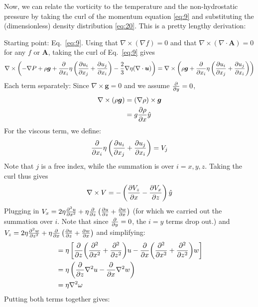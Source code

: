 \documentclass[document.tex]{subfiles}
\begin{document}
Now, we can relate the vorticity to the temperature and the non-hydrostatic pressure by taking the curl of the momentum equation \eqref{eq:9} and substituting the 
(dimensionless) density distribution \eqref{eq:20}. This is a pretty lengthy derivation: 
\begin{mdframed}
    Starting point: Eq.~\eqref{eq:9}. Using that $\nabla \times (\nabla f) = 0$ and that $\nabla \times (\nabla \cdot \bm{A}) = 0$ for any $f$ or $\bm{A}$, taking the curl of Eq.~\eqref{eq:9} gives 
    \begin{align*}
        \nabla \times \left(-\nabla P + \rho \bm{g} + \pdv{x_i}\eta\left(\pdv{u_i}{x_j}+\pdv{u_j}{x_i}\right) - \frac{2}{3}\nabla \eta (\nabla \cdot \bm{u})\right)  = \nabla \times \left(\rho \bm{g}+\pdv{x_i}\eta\left(\pdv{u_i}{x_j}+\pdv{u_j}{x_i}\right) \right) \\
    \end{align*}
    Each term separately: 
    Since $\nabla \times \bm{g} = 0$ and we assume $\pdv{y} = 0$, 
    \begin{align*}
        \nabla \times (\rho\bm{g}) &= (\nabla \rho) \times \bm{g} \\
        &= g \pdv{\rho}{x}\hat{y}
    \end{align*}
    For the viscous term, we define: 
    \begin{align*}
        \pdv{x_i}\eta\left(\pdv{u_i}{x_j}+\pdv{u_j}{x_i}\right) = V_j
    \end{align*}
    Note that $j$ is a free index, while the summation is over $i=x,y,z$. Taking the curl thus gives
    \begin{align*}
        \nabla \times V &= -\left(\pdv{V_z}{x} -\pdv{V_x}{z}\right)\hat{y} \\
    \end{align*}
    Plugging in $V_x = 2\eta\pdv[2]{u}{x} + \eta \pdv{z}\left(\pdv{u}{z}+\pdv{w}{x}\right)$ (for which we carried out the summation over $i$. Note that since $\pdv{y} = 0$, the $i=y$ terms drop out.) and 
    $V_z = 2\eta\pdv[2]{w}{z} + \eta \pdv{x}\left(\pdv{u}{z}+\pdv{w}{x}\right)$ and simplifying: 
    \begin{align*}
        &= \eta\left[\pdv{z}(\pdv[2]{x}+\pdv[2]{z})u - \pdv{x}(\pdv[2]{x}+\pdv[2]{z})w\right] \\
        &=\eta \left(\pdv{z}\nabla^2u - \pdv{x}\nabla^2w\right)\\
        &= \eta\nabla^2\omega 
    \end{align*}
    Putting both terms together gives: 
    \begin{align*}

\end{align*}
\end{mdframed}
\end{document}
